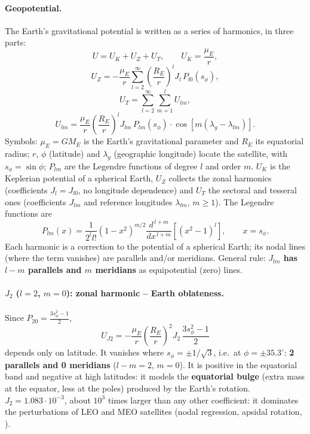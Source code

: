 \answer
\paragraph{Geopotential.} The Earth's gravitational potential is written as a series of harmonics, in three parts:
\begin{equation}
U=U_K+U_Z+U_T,\qquad U_K=\frac{\mu_E}{r},
\end{equation}
\begin{equation}
U_Z=-\frac{\mu_E}{r}\sum_{l=2}^{\infty}\left(\frac{R_E}{r}\right)^{l}J_l\,P_{l0}(s_\phi),
\end{equation}
\begin{equation}
U_T=\sum_{l=2}^{\infty}\sum_{m=1}^{l}U_{lm},
\end{equation}
\begin{equation}
U_{lm}=\frac{\mu_E}{r}\left(\frac{R_E}{r}\right)^{l}J_{lm}\,P_{lm}(s_\phi)\cdot\cos\!\left[m(\lambda_g-\lambda_{lm})\right].
\end{equation}
Symbols: $\mu_E=GM_E$ is the Earth's gravitational parameter and $R_E$ its equatorial radius; $r$, $\phi$ (latitude) and $\lambda_g$
(geographic longitude) locate the satellite, with $s_\phi=\sin\phi$; $P_{lm}$ are the Legendre functions of degree $l$ and order $m$.
$U_K$ is the Keplerian potential of a spherical Earth, $U_Z$ collects the zonal harmonics (coefficients $J_l=J_{l0}$, no longitude
dependence) and $U_T$ the sectoral and tesseral ones (coefficients $J_{lm}$ and reference longitudes $\lambda_{lm}$, $m\ge1$).
The Legendre functions are
\begin{equation}
P_{lm}(x)=\frac{1}{2^{l}l!}\left(1-x^{2}\right)^{m/2}\frac{d^{\,l+m}}{dx^{\,l+m}}\left[(x^{2}-1)^{l}\right],\qquad x=s_\phi .
\end{equation}
Each harmonic is a correction to the potential of a spherical Earth; its nodal lines (where the term vanishes) are parallels and/or
meridians. General rule: \textbf{$J_{lm}$ has $l-m$ parallels and $m$ meridians} as equipotential (zero) lines.

\paragraph{$J_2$ ($l=2$, $m=0$): zonal harmonic -- Earth oblateness.} Since $P_{20}=\frac{3s_\phi^2-1}{2}$,
\[U_{J2}=-\frac{\mu_E}{r}\left(\frac{R_E}{r}\right)^2J_2\,\frac{3s_\phi^2-1}{2}\]
depends only on latitude. It vanishes where
$s_\phi=\pm1/\sqrt3$, i.e.\ at $\phi=\pm35.3^\circ$: \textbf{2 parallels and 0 meridians} ($l-m=2$, $m=0$). It is positive in the
equatorial band and negative at high latitudes: it models the \textbf{equatorial bulge} (extra mass at the equator, less at the poles)
produced by the Earth's rotation. $J_2=1.083\cdot10^{-3}$, about $10^3$ times larger than any other coefficient: it dominates the
perturbations of LEO and MEO satellites (nodal regression, apsidal rotation, ).

